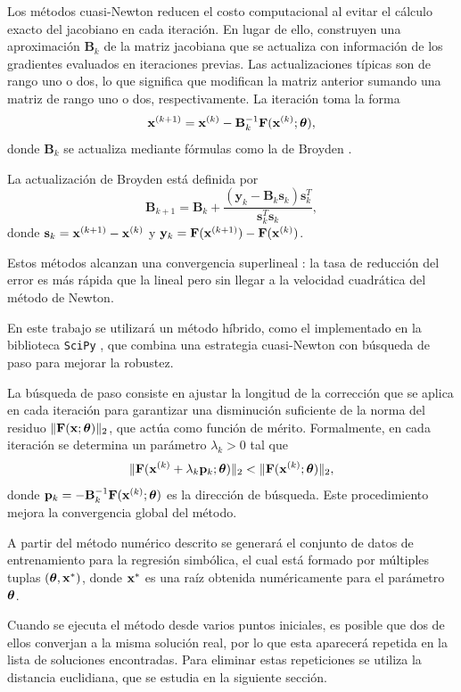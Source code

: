 Los métodos cuasi-Newton \cite{nocedal2006numerical} reducen el costo computacional al evitar el cálculo exacto del jacobiano en cada iteración. En lugar de ello, construyen una aproximación \(\mathbf{B}_k\) de la matriz jacobiana que se actualiza con información de los gradientes evaluados en iteraciones previas. Las actualizaciones típicas son de rango uno o dos, lo que significa que modifican la matriz anterior sumando una matriz de rango uno o dos, respectivamente. La iteración toma la forma
\[
\mathbf{x}^{(k+1)} = \mathbf{x}^{(k)} - \mathbf{B}_k^{-1} \mathbf{F}(\mathbf{x}^{(k)}; \boldsymbol{\theta}),
\]
donde \(\mathbf{B}_k\) se actualiza mediante fórmulas como la de Broyden \cite{broyden1965class}.

La actualización de Broyden está definida por
\[
\mathbf{B}_{k+1} = \mathbf{B}_k + \frac{(\mathbf{y}_k - \mathbf{B}_k \mathbf{s}_k) \mathbf{s}_k^T} {\mathbf{s}_k^T \mathbf{s}_k},
\]
donde \(\mathbf{s}_k = \mathbf{x}^{(k+1)} - \mathbf{x}^{(k)}\) y
\(\mathbf{y}_k = \mathbf{F}(\mathbf{x}^{(k+1)}) - \mathbf{F}(\mathbf{x}^{(k)})\).

Estos métodos alcanzan una convergencia superlineal \cite{nocedal2006numerical}: la tasa de reducción del error es más rápida que la lineal pero sin llegar a la velocidad cuadrática del método de Newton.

En este trabajo se utilizará un método híbrido, como el implementado en la biblioteca \texttt{SciPy} \cite{virtanen2020scipy}, que combina una estrategia cuasi-Newton con búsqueda de paso para mejorar la robustez.

La búsqueda de paso consiste en ajustar la longitud de la corrección que se aplica en cada iteración para garantizar una disminución suficiente de la norma del residuo \(\|\mathbf{F}(\mathbf{x}; \boldsymbol{\theta})\|_2\), que actúa como función de mérito. Formalmente, en cada iteración se determina un parámetro \(\lambda_k > 0\) tal que
\[
\|\mathbf{F}(\mathbf{x}^{(k)} + \lambda_k \mathbf{p}_k; \boldsymbol{\theta})\|_2 < \|\mathbf{F}(\mathbf{x}^{(k)}; \boldsymbol{\theta})\|_2,
\]
donde \(\mathbf{p}_k = -\mathbf{B}_k^{-1}\mathbf{F}(\mathbf{x}^{(k)}; \boldsymbol{\theta})\) es la dirección de búsqueda. Este procedimiento mejora la convergencia global del método.

A partir del método numérico descrito se generará el conjunto de datos de entrenamiento para la regresión simbólica, el cual está formado por múltiples tuplas \((\boldsymbol{\theta}, \mathbf{x}^*)\), donde \(\mathbf{x}^*\) es una raíz obtenida numéricamente para el parámetro \(\boldsymbol{\theta}\).

Cuando se ejecuta el método desde varios puntos iniciales, es posible que dos de ellos converjan a la misma solución real, por lo que esta aparecerá repetida en la lista de soluciones encontradas. Para eliminar estas repeticiones se utiliza la distancia euclidiana, que se estudia en la siguiente sección.

